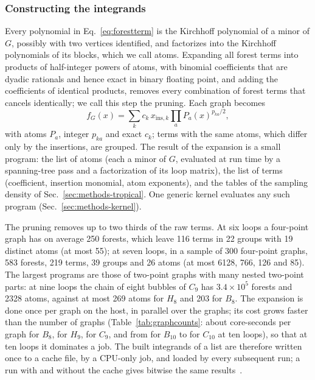 \subsubsection{Constructing the integrands}
\label{sec:methods-construction}

Every polynomial in Eq.~\eqref{eq:forestterm} is the Kirchhoff polynomial of a minor of $G$, possibly with two vertices
identified, and factorizes into the Kirchhoff polynomials of its blocks, which we call atoms. Expanding all forest terms
into products of half-integer powers of atoms, with binomial coefficients that are dyadic rationals and hence exact in
binary floating point, and adding the coefficients of identical products, removes every combination of forest terms
that cancels identically; we call this step the pruning. Each graph becomes
\begin{equation}
f_G(x)=\sum_k c_k\,x_{\mathrm{ins},k}\prod_a P_a(x)^{p_{ka}/2},
\label{eq:integrand}
\end{equation}
with atoms $P_a$, integer $p_{ka}$ and exact $c_k$; terms with the same atoms, which differ only by the insertions, are
grouped. The result of the expansion is a small program: the list of atoms (each a minor of $G$, evaluated at run time
by a spanning-tree pass and a factorization of its loop matrix), the list of terms (coefficient, insertion monomial,
atom exponents), and the tables of the sampling density of Sec.~\ref{sec:methods-tropical}. One generic kernel
evaluates any such program (Sec.~\ref{sec:methods-kernel}).

The pruning removes up to two thirds of the raw terms. At six loops a four-point graph has on average 250 forests,
which leave 116 terms in 22 groups with 19 distinct atoms (at most 55); at seven loops, in a sample of 300 four-point
graphs, 583 forests, 219 terms, 39 groups and 26 atoms (at most 6128, 766, 126 and 85). The largest programs are
those of two-point graphs with many nested two-point parts: at nine loops the chain of eight bubbles of $C_9$ has
$3.4\times10^5$ forests and 2328 atoms, against at most 269 atoms for $H_8$ and 203 for $B_8$. The expansion is done
once per graph on the host, in parallel over the graphs; its cost grows faster than the number of graphs
(Table~\ref{tab:graphcounts}: about  core-seconds per graph for $B_8$,  for $H_9$,
 for $C_9$, and from  for $B_{10}$ to  for $C_{10}$ at ten loops), so that at ten
loops it dominates a job. The built integrands of a list are therefore
written once to a cache file, by a CPU-only job, and loaded by every subsequent run; a run with and without the cache
gives bitwise the same results~.

